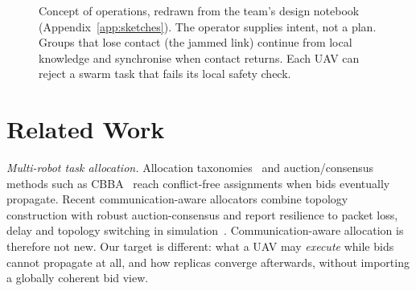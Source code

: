\documentclass[conference]{IEEEtran}
\begin{document}
\begin{figure}[t]
{}
\caption{Concept of operations, redrawn from the team's design notebook
(Appendix~\ref{app:sketches}). The operator supplies intent, not a plan.
Groups that lose contact (the jammed link) continue from local knowledge and
synchronise when contact returns. Each UAV can reject a swarm task that fails
its local safety check.}
\label{fig:conops}
\end{figure}

\section{Related Work}
\label{sec:related}

\emph{Multi-robot task allocation.} Allocation taxonomies~\cite{gerkey2004taxonomy}
and auction/consensus methods such as CBBA~\cite{choi2009cbba} reach
conflict-free assignments when bids eventually propagate. Recent
communication-aware allocators combine topology construction with robust
auction-consensus and report resilience to packet loss, delay and topology
switching in simulation~\cite{lu2026commaware}. Communication-aware
allocation is therefore not new. Our target is different: what a UAV may
\emph{execute} while bids cannot propagate at all, and how replicas converge
afterwards, without importing a globally coherent bid view.
\end{document}
